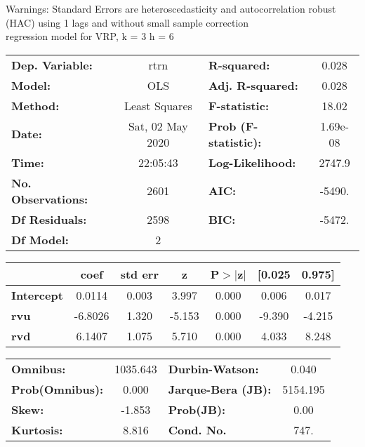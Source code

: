 Warnings: \newline
 [1] Standard Errors are heteroscedasticity and autocorrelation robust (HAC) using 1 lags and without small sample correction\\ 

regression model for VRP, k = 3 h = 6\begin{center}
\begin{tabular}{lclc}
\toprule
\textbf{Dep. Variable:}    &       rtrn       & \textbf{  R-squared:         } &     0.028   \\
\textbf{Model:}            &       OLS        & \textbf{  Adj. R-squared:    } &     0.028   \\
\textbf{Method:}           &  Least Squares   & \textbf{  F-statistic:       } &     18.02   \\
\textbf{Date:}             & Sat, 02 May 2020 & \textbf{  Prob (F-statistic):} &  1.69e-08   \\
\textbf{Time:}             &     22:05:43     & \textbf{  Log-Likelihood:    } &    2747.9   \\
\textbf{No. Observations:} &        2601      & \textbf{  AIC:               } &    -5490.   \\
\textbf{Df Residuals:}     &        2598      & \textbf{  BIC:               } &    -5472.   \\
\textbf{Df Model:}         &           2      & \textbf{                     } &             \\
\bottomrule
\end{tabular}
\begin{tabular}{lcccccc}
                   & \textbf{coef} & \textbf{std err} & \textbf{z} & \textbf{P$> |$z$|$} & \textbf{[0.025} & \textbf{0.975]}  \\
\midrule
\textbf{Intercept} &       0.0114  &        0.003     &     3.997  &         0.000        &        0.006    &        0.017     \\
\textbf{rvu}       &      -6.8026  &        1.320     &    -5.153  &         0.000        &       -9.390    &       -4.215     \\
\textbf{rvd}       &       6.1407  &        1.075     &     5.710  &         0.000        &        4.033    &        8.248     \\
\bottomrule
\end{tabular}
\begin{tabular}{lclc}
\textbf{Omnibus:}       & 1035.643 & \textbf{  Durbin-Watson:     } &    0.040  \\
\textbf{Prob(Omnibus):} &   0.000  & \textbf{  Jarque-Bera (JB):  } & 5154.195  \\
\textbf{Skew:}          &  -1.853  & \textbf{  Prob(JB):          } &     0.00  \\
\textbf{Kurtosis:}      &   8.816  & \textbf{  Cond. No.          } &     747.  \\
\bottomrule
\end{tabular}
\end{center}

